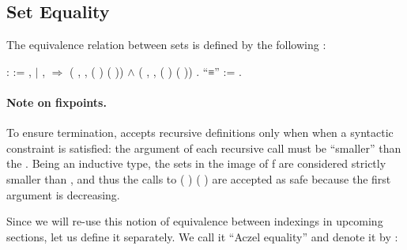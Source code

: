 \subsection{Set Equality}

The equivalence relation between \ZF{} sets is defined by the following \Coq{} :

\begin{coqdoccode}
  \coqdocnoindent
      :  :=\coqdoceol
  \coqdocindent{1.00em}
   ,  \coqdoceol
  \coqdocindent{1.00em}
  \ensuremath{|}   ,    \ensuremath{\Rightarrow}\coqdoceol
  \coqdocindent{2.00em}
  (\coqdockw{\ensuremath{\forall}} , \coqdoctac{\ensuremath{\exists}} ,  ( ) ( )) \ensuremath{\land} (\coqdockw{\ensuremath{\forall}} , \coqdoctac{\ensuremath{\exists}} ,  ( ) ( ))\coqdoceol
  \coqdocindent{1.00em}
  .\coqdoceol
  \coqdocnoindent
{} ``≡'' := .\coqdoceol
\coqdocemptyline
\end{coqdoccode}

\paragraph{Note on fixpoints.} To ensure termination, \Coq{} accepts recursive definitions only when when a syntactic constraint is satisfied: the argument of each recursive call must be ``smaller'' than the \TODO{}. Being  an inductive type, the sets in the image of \var f are considered strictly smaller than   , and thus the calls to  ( ) ( ) are accepted as safe because the first argument is decreasing.

\TODO{}Since we will re-use this notion of equivalence between indexings in upcoming sections, let us define it separately. We call it ``Aczel equality'' and denote it by \AEQ:


